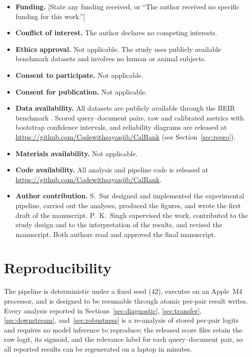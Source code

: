 \documentclass[sn-mathphys-num,pdflatex]{sn-jnl}
\begin{document}
\begin{itemize}[leftmargin=*,itemsep=2pt]
  \item \textbf{Funding.} [State any funding received, or ``The author received
  no specific funding for this work.'']
  \item \textbf{Conflict of interest.} The author declares no competing interests.
  \item \textbf{Ethics approval.} Not applicable. The study uses publicly
  available benchmark datasets and involves no human or animal subjects.
  \item \textbf{Consent to participate.} Not applicable.
  \item \textbf{Consent for publication.} Not applicable.
  \item \textbf{Data availability.} All datasets are publicly available through
  the BEIR benchmark \cite{thakur2021beir}. Scored query--document pairs, raw and
  calibrated metrics with bootstrap confidence intervals, and reliability diagrams
  are released at \url{https://github.com/Codewithsayanjib/CalRank} (see Section~\ref{sec:repro}).
  \item \textbf{Materials availability.} Not applicable.
  \item \textbf{Code availability.} All analysis and pipeline code is released at
  \url{https://github.com/Codewithsayanjib/CalRank}.
  \item \textbf{Author contribution.} S.\ Sur designed and implemented the
  experimental pipeline, carried out the analyses, produced the figures, and wrote
  the first draft of the manuscript. P.\ K.\ Singh supervised the work, contributed
  to the study design and to the interpretation of the results, and revised the
  manuscript. Both authors read and approved the final manuscript.
\end{itemize}

\section*{Reproducibility}\label{sec:repro}
The pipeline is deterministic under a fixed seed ($42$), executes on an
Apple~M4 processor, and is designed to be resumable through atomic per-pair
result writes. Every analysis reported in Sections~\ref{sec:diagnostic},
\ref{sec:transfer}, \ref{sec:downstream}, and~\ref{sec:robustness} is a
re-analysis of stored per-pair logits and requires no model inference to
reproduce; the released score files retain the raw logit, its sigmoid, and the
relevance label for each query--document pair, so all reported results can be
regenerated on a laptop in minutes.
\end{document}
